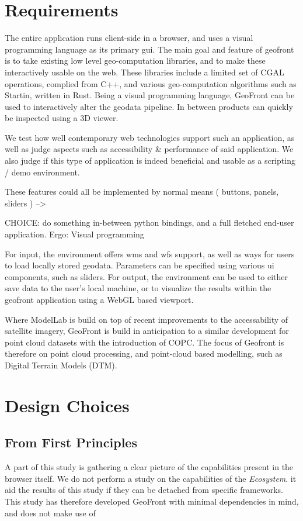 \section{ Requirements }


The entire application runs client-side in a browser, and uses a visual programming language as its primary \ac{gui}.
The main goal and feature of geofront is to take existing low level geo-computation libraries, and to make these interactively usable on the web. 
These libraries include a limited set of CGAL operations, complied from C++, and various geo-computation algorithms such as Startin, written in Rust. 
Being a visual programming language, GeoFront can be used to interactively alter the geodata pipeline. 
In between products can quickly be inspected using a 3D viewer.

We test how well contemporary web technologies support such an application, as well as judge aspects such as accessibility \& performance of said application. We also judge if this type of application is indeed beneficial and usable as a scripting / demo environment.  

These features could all be implemented by normal means ( buttons, panels, sliders ) -->

CHOICE: do something in-between python bindings, and a full fletched end-user application. 
Ergo: Visual programming

For input, the environment offers \ac{wms} and \ac{wfs} support, as well as ways for users to load locally stored geodata. Parameters can be specified using various ui components, such as sliders. 
For output, the environment can be used to either save data to the user's local machine, or to visualize the results within the geofront application using a WebGL based viewport.

Where ModelLab is build on top of recent improvements to the accessability of satellite imagery, GeoFront is build in anticipation to a similar development for point cloud datasets with the introduction of COPC. The focus of Geofront is therefore on point cloud processing, and point-cloud based modelling, such as Digital Terrain Models (DTM). 


\section{ Design Choices }


\subsection{ From First Principles }
A part of this study is gathering a clear picture of the capabilities present in the browser itself. We do not perform a study on the capabilities of the \emph{Ecosystem}. it aid the results of this study if they can be detached from specific frameworks.
This study has therefore developed GeoFront with minimal dependencies in mind, and does not make use of 


